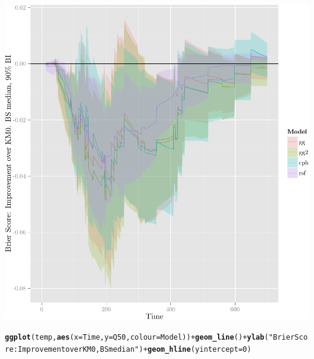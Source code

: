 \documentclass{article}\usepackage[]{graphicx}\usepackage[]{color}
\makeatletter
\def\maxwidth{ %
  \ifdim\Gin@nat@width>\linewidth
    \linewidth
  \else
    \Gin@nat@width
  \fi
}
\newcommand{\hlnum}[1]{\textcolor[rgb]{0.686,0.059,0.569}{#1}}%
\newcommand{\hlstr}[1]{\textcolor[rgb]{0.192,0.494,0.8}{#1}}%
\newcommand{\hlopt}[1]{\textcolor[rgb]{0,0,0}{#1}}%
\newcommand{\hlstd}[1]{\textcolor[rgb]{0.345,0.345,0.345}{#1}}%
\newcommand{\hlkwc}[1]{\textcolor[rgb]{0.333,0.667,0.333}{#1}}%
\newcommand{\hlkwd}[1]{\textcolor[rgb]{0.737,0.353,0.396}{\textbf{#1}}}%
\newenvironment{kframe}{%
 \def\at@end@of@kframe{}%
 \ifinner\ifhmode%
  \def\at@end@of@kframe{\end{minipage}}%
  \begin{minipage}{\columnwidth}%
 \fi\fi%
 \def\FrameCommand##1{\hskip\@totalleftmargin \hskip-\fboxsep
 \colorbox{shadecolor}{##1}\hskip-\fboxsep
     \hskip-\linewidth \hskip-\@totalleftmargin \hskip\columnwidth}%
 \MakeFramed {\advance\hsize-\width
   \@totalleftmargin\z@ \linewidth\hsize
   \@setminipage}}%
 {\par\unskip\endMakeFramed%
 \at@end@of@kframe}
\newenvironment{knitrout}{}{} %
\makeatother
\begin{document}
\begin{knitrout}
{\centering \includegraphics[width=\maxwidth]{figure/05-model-selection-bs-paths-4} 

}


\begin{kframe}\begin{alltt}
\hlkwd{ggplot}\hlstd{(temp,} \hlkwd{aes}\hlstd{(}\hlkwc{x} \hlstd{= Time,} \hlkwc{y} \hlstd{= Q50,} \hlkwc{colour} \hlstd{= Model))} \hlopt{+} \hlkwd{geom_line}\hlstd{()} \hlopt{+} \hlkwd{ylab}\hlstd{(}\hlstr{"Brier Score: Improvement over KM0, BS median"}\hlstd{)} \hlopt{+} \hlkwd{geom_hline}\hlstd{(}\hlkwc{yintercept} \hlstd{=} \hlnum{0}\hlstd{)}
\end{alltt}
\end{kframe}


\end{knitrout}
\end{document}
